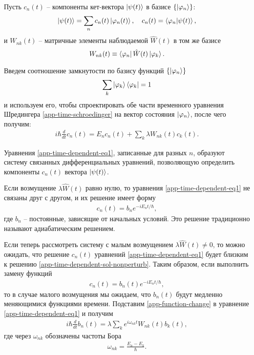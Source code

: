 \begin{subappendices}
Пусть $c_n(t)$ -- компоненты кет-вектора $\ket{\psi(t)}$ в базисе $\left\{ \ket{\varphi_n} \right\}$:
\begin{gather}
    \ket{\psi(t)} = \sum_n c_n(t) \ket{\varphi_n(t)}, \quad c_n(t) = \braket{\varphi_n | \psi(t) }, \label{app-expansion}
\end{gather}
и $W_{nk}(t)$ -- матричные элементы наблюдаемой $\hat{W}(t)$ в том же базисе
\begin{gather}
    W_{nk}(t) \equiv \bra{\varphi_n} \hat{W}(t) \ket{\varphi_k}.
\end{gather}

Введем соотношение замкнутости по базису функций $\left\{ \ket{\varphi_n} \right\}$
\begin{gather}
    \sum_k \ket{\varphi_k} \bra{\varphi_k} = 1 \label{app-completeness}
\end{gather}
и используем его, чтобы спроектировать обе части временного уравнения Шредингера \eqref{app-time-schroedinger} на вектор состояния $\ket{\varphi_n}$, после чего получим:
\begin{gather}
    i \hbar \frac{d}{dt} c_n(t) = E_n c_n(t) + \sum_k \lambda W_{nk}(t) c_k(t). \label{app-time-dependent-eq1} 
\end{gather}

Уравнения \eqref{app-time-dependent-eq1}, записанные для разных $n$, образуют систему связанных дифференциальных уравнений, позволяющую определить компоненты $c_n(t)$ вектора $\ket{\psi(t)}$. \par
Если возмущение $\lambda \hat{W}(t)$ равно нулю, то уравнения \eqref{app-time-dependent-eq1} не связаны друг с другом, и их решение имеет форму
\begin{gather}
    c_n(t) = b_n e^{-i E_n t / \hbar}, \label{app-time-dependent-sol-nonperturb}
\end{gather}
где $b_n$ -- постоянные, зависящие от начальных условий. Это решение традиционно называют адиабатическим решением. \par
Если теперь рассмотреть систему с малым возмущением $\lambda \hat{W}(t) \neq 0$, то можно ожидать, что решение $c_n(t)$ уравнений \eqref{app-time-dependent-eq1} будет близким к решению \eqref{app-time-dependent-sol-nonperturb}. Таким образом, если выполнить замену функций
\begin{gather}
    c_n(t) = b_n(t) e^{-i E_n t / \hbar}, \label{app-function-change}
\end{gather}
то в случае малого возмущения мы ожидаем, что $b_n(t)$ будут медленно меняющимися функциями времени. Подставим \eqref{app-function-change} в уравнение \eqref{app-time-dependent-eq1} и получим
\begin{gather}
    i \hbar \frac{d}{dt} b_n(t) = \lambda \sum_k e^{i \omega_{nk} t} W_{nk}(t) b_k(t), \label{app-time-dependent-eq2} 
\end{gather}
где через $\omega_{nk}$ обозначены частоты Бора
\begin{gather}
    \omega_{nk} = \frac{E_n - E_k}{\hbar}.
\end{gather}


\end{subappendices}
